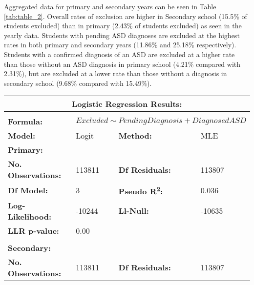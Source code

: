 \documentclass[
]{article}
\begin{document}
Aggregated data for primary and secondary years can be seen in Table
\ref{tab:table_2}. Overall rates of exclusion are higher in Secondary
school (15.5\% of students excluded) than in primary (2.43\% of students
excluded) as seen in the yearly data. Students with pending ASD
diagnoses are excluded at the highest rates in both primary and
secondary years (11.86\% and 25.18\% respectively). Students with a
confirmed diagnosis of an ASD are excluded at a higher rate than those
without an ASD diagnosis in primary school (4.21\% compared with
2.31\%), but are excluded at a lower rate than those without a diagnosis
in secondary school (9.68\% compared with 15.49\%).

\begin{table}[H]
\centering
\begin{scriptsize}
\begin{tabular}{lllllll}
\toprule
\multicolumn{7}{c}{\textbf{Logistic Regression Results:}} \\[1mm]
\midrule\\
\multicolumn{2}{l}{\hspace{1cm}\textbf{Formula:}} & \multicolumn{5}{l}{\textit{$Excluded \sim Pending Diagnosis + Diagnosed ASD$}} \\[1mm]
\multicolumn{2}{l}{\hspace{1cm}\textbf{Model:}} & Logit & \multicolumn{2}{l}{\textbf{Method:}} & MLE & \\[1.5mm]
\multicolumn{2}{l}{\textbf{Primary:}} & & & & & \\[1.5mm]
\multicolumn{2}{l}{\hspace{1cm}\textbf{No. Observations:}} & 113811 & \multicolumn{2}{l}{\textbf{Df Residuals:}} & 113807 & \\[0.5mm]
\multicolumn{2}{l}{\hspace{1cm}\textbf{Df Model:}} & 3 & \multicolumn{2}{l}{\textbf{Pseudo R\textsuperscript{2}:}} & 0.036 & \\[0.5mm]
\multicolumn{2}{l}{\hspace{1cm}\textbf{Log-Likelihood:}} & -10244 & \multicolumn{2}{l}{\textbf{Ll-Null:}} & -10635 & \\[0.5mm]
\multicolumn{2}{l}{\hspace{1cm}\textbf{LLR p-value:}} & \multicolumn{5}{l}{0.00} \\\\
\multicolumn{2}{l}{\textbf{Secondary:}} & & & & & \\[1.5mm]
\multicolumn{2}{l}{\hspace{1cm}\textbf{No. Observations:}} & 113811 & \multicolumn{2}{l}{\textbf{Df Residuals:}} & 113807 & \\[0.5mm]

\end{tabular}
\end{scriptsize}
\end{table}
\end{document}

